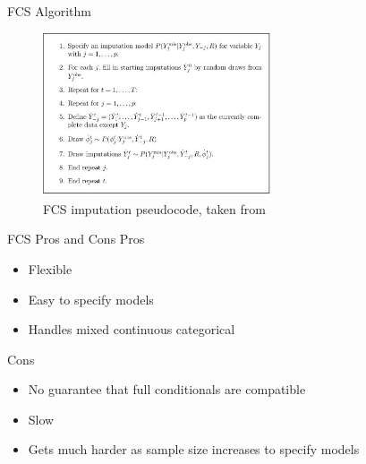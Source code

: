 \begin{frame}{FCS Algorithm}
  \begin{figure}[h!]
  \centering
    \includegraphics[width=0.6\textwidth]{fcs_algo}
  \caption{FCS imputation pseudocode, taken from \cite{VanBuuren2012}}
\label{fig:fcsexample}
\end{figure}
\end{frame}

\begin{frame}{FCS Pros and Cons}
Pros
 \begin{itemize}
  \item Flexible
  \item Easy to specify models
  \item Handles mixed continuous categorical
 \end{itemize}

 Cons
 \begin{itemize}
  \item No guarantee that full conditionals are compatible
  \item Slow
  \item Gets much harder as sample size increases to specify models
 \end{itemize}

\end{frame}

